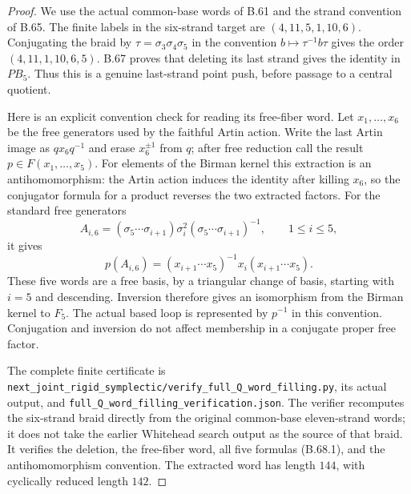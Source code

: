 \begin{proof}
We use the actual common-base words of B.61 and the
strand convention of B.65.  The finite labels in the
six-strand target are $(4,11,5,1,10,6)$.
Conjugating the braid by $\tau=\sigma_3\sigma_4\sigma_5$
in the convention $b\mapsto\tau^{-1}b\tau$ gives the
order $(4,11,1,10,6,5)$.
B.67 proves that deleting its last strand gives the
identity in $PB_5$.  Thus this is a genuine last-strand
point push, before passage to a central quotient.

Here is an explicit convention check for reading its
free-fiber word.  Let $x_1,\ldots,x_6$ be the free
generators used by the faithful Artin action.  Write
the last Artin image as $q x_6 q^{-1}$ and erase
$x_6^{\pm1}$ from $q$; after free reduction call the
result $p\in F(x_1,\ldots,x_5)$.
For elements of the Birman kernel this extraction is
an antihomomorphism: the Artin action induces the
identity after killing $x_6$, so the conjugator formula
for a product reverses the two extracted factors.
For the standard free generators
\[
 A_{i,6}=(\sigma_5\cdots\sigma_{i+1})\sigma_i^2
                  (\sigma_5\cdots\sigma_{i+1})^{-1},
 \qquad 1\leq i\leq5,
\]
it gives
\[
 p(A_{i,6})=(x_{i+1}\cdots x_5)^{-1}x_i
                         (x_{i+1}\cdots x_5).                 \tag{B.68.1}
\]
These five words are a free basis, by a triangular
change of basis, starting with $i=5$ and descending.
Inversion therefore gives an isomorphism from the
Birman kernel to $F_5$.  The actual based loop is
represented by $p^{-1}$ in this convention.
Conjugation and inversion do not affect membership
in a conjugate proper free factor.

The complete finite certificate is
\nolinkurl{next_joint_rigid_symplectic/verify_full_Q_word_filling.py},
its actual output, and
\nolinkurl{full_Q_word_filling_verification.json}.
The verifier recomputes the six-strand braid directly
from the original common-base eleven-strand words;
it does not take the earlier Whitehead search output
as the source of that braid.
It verifies the deletion, the free-fiber word, all five
formulas (B.68.1), and the antihomomorphism convention.
The extracted word has length $144$, with cyclically
reduced length $142$.


\end{proof}
